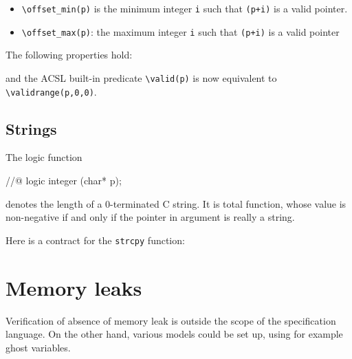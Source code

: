 \begin{itemize}
\item \lstinline|\offset_min(p)| is the minimum integer
\lstinline|i| such that \lstinline|(p+i)| is a
  valid pointer.

\item \lstinline|\offset_max(p)|: the maximum integer
  \lstinline|i| such that \lstinline|(p+i)| is a
  valid pointer
\end{itemize}
The following properties hold:
and the ACSL built-in predicate \lstinline|\valid(p)| is now equivalent to
\lstinline|\validrange(p,0,0)|.

\subsection{Strings}

\experimental
\begin{notimplementedenv}
The logic function
\begin{listing-nonumber}
//@ logic integer \strlen(char* p);
\end{listing-nonumber}
\end{notimplementedenv}
denotes the length of a 0-terminated C string. It is total function,
whose value is non-negative if and only if the pointer in argument is
really a string.

\begin{example}
  Here is a contract for the \lstinline|strcpy| function:

\end{example}

\section{Memory leaks}

\experimental

Verification of absence of memory leak is outside the scope of the
specification language. On the other hand, various models could be set
up, using for example ghost variables.

